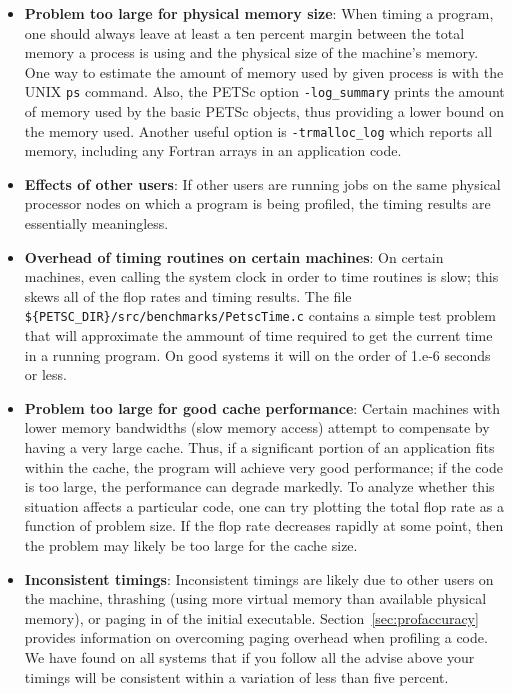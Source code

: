 \begin{itemize}
\item {\bf Problem too large for physical memory size}: When timing a program, one
      should always leave at least a ten percent margin between the total
      memory a process is using and the physical size of 
      the machine's memory. One way to estimate the amount of 
      memory used by given process is with the UNIX {\tt ps} command.
      Also, the PETSc option {\tt -log\_summary} prints the amount of 
      memory used by the basic PETSc objects, thus providing a lower
      bound on the memory used.  Another useful option is {\tt -trmalloc\_log}
      which reports all memory, including any Fortran arrays in an
      application code.
\item {\bf Effects of other users}:  If other users are running
      jobs on the same physical processor nodes on which a program is being profiled,
      the timing results are essentially meaningless. 
\item {\bf Overhead of timing routines on certain machines}: On certain machines,
      even calling the system clock in order to time routines is 
      slow; this skews all of the flop rates and timing results. The file
      {\tt \$\{PETSC\_DIR\}/src/benchmarks/PetscTime.c} contains a
      simple test problem that will approximate the ammount of time
      required to get the current time in a running program. On good
      systems it will on the order of 1.e-6 seconds or less.
\item {\bf Problem too large for good cache performance}: Certain machines
      with lower memory bandwidths (slow memory access) attempt to 
      compensate by having a very large cache.  Thus, if a significant
      portion of an application fits within the cache, the program will achieve very 
      good performance; if the code is too large, the performance can degrade markedly.
      To analyze whether this situation affects a particular code, one can
      try plotting the total flop rate as a function of problem
      size.  If the flop rate decreases rapidly at some point, then the
      problem may likely be too large for the cache size. 
\item {\bf Inconsistent timings}:  Inconsistent timings are likely due to other
      users on the machine, thrashing (using more virtual memory than available
      physical memory), or paging in of the initial executable.  
      Section~\ref{sec:profaccuracy} provides information on overcoming paging
      overhead when profiling a code. We have found on all systems that if you 
      follow all the advise above your timings will be consistent within a variation
      of less than five percent.
\end{itemize}

